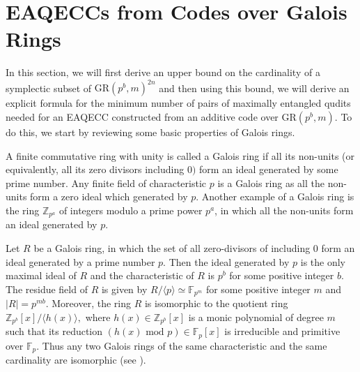 \documentclass{article}
\theoremstyle{remark}
\theoremstyle{definition}
\numberwithin{equation}{section}
\begin{document}
\section{EAQECCs from Codes over Galois Rings}\label{sec5}
In this section, we will first derive an upper bound on the cardinality of a symplectic subset of $\text{GR}(p^b,m)^{2n}$ and then using this bound, we will derive an explicit formula for the minimum number of pairs of maximally entangled qudits needed for an EAQECC constructed from an additive code over $\text{GR}(p^b,m)$.  To do this, we start by reviewing some basic properties of Galois rings.

A finite commutative ring with unity is called a Galois ring if all its non-units (or equivalently, all its zero divisors  including $0)$ form an ideal generated by some prime number. Any finite field of characteristic $p$ is a Galois ring as all the non-units form a zero ideal which generated by $p$. Another example of a Galois ring is the ring $\mathbb{Z}_{p^a}$ of integers modulo a prime power $p^a$, in which all the non-units form an ideal generated by $p$.

Let $R$ be a Galois ring, in which the set of all zero-divisors of including $0$ form an ideal generated by a prime number $p$. Then the ideal generated by $p$ is the only maximal ideal of ${R}$ and the characteristic of ${R}$ is $p^b$ for some positive integer $b$. The residue field of ${R}$ is given by ${R} / \langle p \rangle \simeq  \mathbb{F}_{p^m}$ for some positive integer $m$ and  $|{R}|=p^{mb}.$ Moreover, the ring $R$ is isomorphic to the quotient ring $\mathbb{Z}_{p^b}[x]/ \langle h(x) \rangle,$ where  $h(x)\in \mathbb{Z}_{p^b}[x]$ is a monic polynomial of degree $m$ such that its reduction $(h(x) \text{ mod } p) \in \mathbb{F}_{p}[x]$ is irreducible and primitive over $\mathbb{F}_{p}.$ Thus any two Galois rings of  the same characteristic and the same cardinality are isomorphic (see \cite[Chp. 14]{wan}). 
\end{document}
